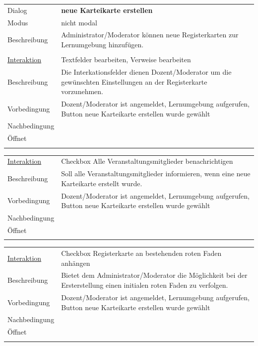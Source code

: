 \documentclass[12pt,a4paper]{article}
\begin{document}
{\begin{tabular}{l p{12cm}}
Dialog 	 		 & \textbf{neue Karteikarte erstellen} \\ 
Modus 			 & nicht modal\\ 
Beschreibung   	 & Administrator/Moderator können neue Registerkarten zur Lernumgebung hinzufügen.\\\\

\underline{Interaktion} & Textfelder bearbeiten, Verweise bearbeiten \\ 
Beschreibung   	 		& Die Interkationsfelder dienen Dozent/Moderator um die gewünschten Einstellungen an der Registerkarte vorzunehmen. \\
Vorbedingung	 		& Dozent/Moderator ist angemeldet, Lernumgebung aufgerufen, Button neue Karteikarte erstellen wurde gewählt \\
Nachbedingung	 		& \\
Öffnet			 		&  \\\\
\end{tabular}

\begin{tabular}{l p{12cm}}
\underline{Interaktion} &  Checkbox Alle Veranstaltungsmitglieder benachrichtigen\\ 
Beschreibung   	 		& Soll alle Veranstaltungsmitglieder informieren, wenn eine neue Karteikarte erstellt wurde.\\
Vorbedingung	 		& Dozent/Moderator ist angemeldet, Lernumgebung aufgerufen, Button neue Karteikarte erstellen wurde gewählt\\
Nachbedingung	 		& \\
Öffnet			 		&  \\\\
\end{tabular}

\begin{tabular}{l p{12cm}}
\underline{Interaktion} & Checkbox Registerkarte an bestehenden roten Faden anhängen    \\ 
Beschreibung   	 		& Bietet dem Administrator/Moderator die Möglichkeit bei der Ersterstellung einen initialen roten Faden zu verfolgen. \\
Vorbedingung	 		& Dozent/Moderator ist angemeldet, Lernumgebung aufgerufen, Button neue Karteikarte erstellen wurde gewählt\\
Nachbedingung	 		& \\
Öffnet			 		&  \\\\
\end{tabular}

}
\end{document}
